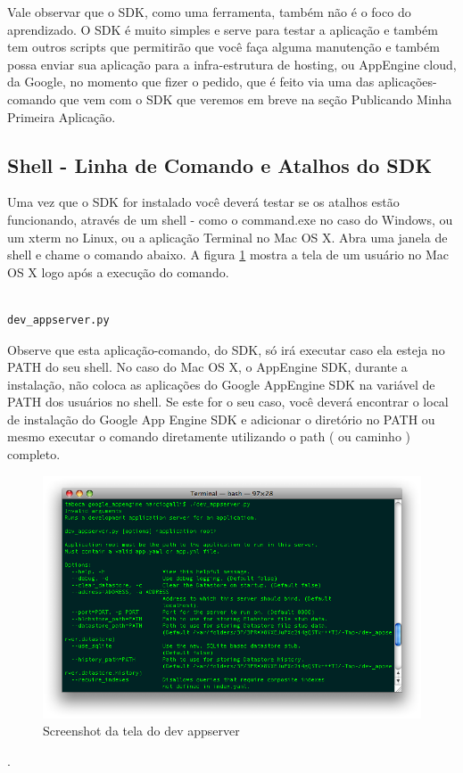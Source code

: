 \documentclass[a4paper]{article}
\begin{document}
Vale observar que o SDK, como uma ferramenta, também não é o foco do aprendizado. O SDK é muito simples e serve para testar a aplicação e também tem outros scripts que permitirão que você faça alguma manutenção e também possa enviar sua aplicação para a infra-estrutura de hosting, ou AppEngine cloud, da Google, no momento que fizer o pedido, que é feito via uma das aplicações-comando que vem com o SDK que veremos em breve na seção Publicando Minha Primeira Aplicação. 


\subsection{Shell - Linha de Comando e Atalhos do SDK}

Uma vez que o SDK for instalado você deverá testar se os atalhos estão funcionando, através de um shell - como o command.exe no caso do Windows, ou um xterm no Linux, ou a aplicação Terminal no Mac OS X. Abra uma janela de shell e chame o comando abaixo. A figura \ref{fig:appengine-sdk} mostra a tela de um usuário no Mac OS X logo após a execução do comando.  


\begin{verbatim}

dev_appserver.py

\end{verbatim}

Observe que esta aplicação-comando, do SDK, só irá executar caso ela esteja no PATH do seu shell. No caso do Mac OS X, o AppEngine SDK, durante a instalação, não coloca as aplicações do Google AppEngine SDK na variável de PATH dos usuários no shell. Se este for o seu caso, você deverá encontrar o local de instalação do Google App Engine SDK e adicionar o diretório no PATH ou mesmo executar o comando diretamente utilizando o path ( ou caminho ) completo. 


\begin{figure}[!h]
\centering
\includegraphics[width=5in]{image-dev_appserver.png}
\caption{Screenshot da tela do dev appserver}
\label{fig:appengine-sdk}
\end{figure}.
\end{document}
